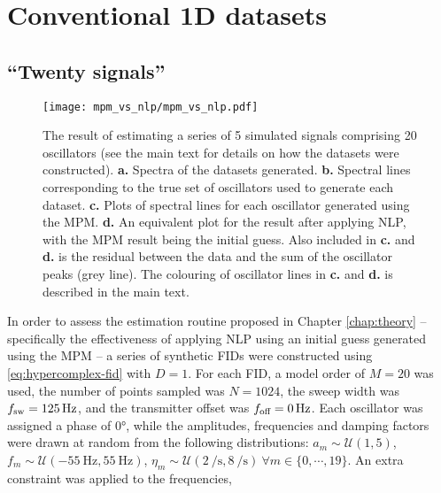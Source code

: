 \section{Conventional \ac{1D} datasets}
\label{sec:evaluation}

\subsection{``Twenty signals''}
\begin{sidewaysfigure}
    \centering
    \texttt{[image: mpm\_vs\_nlp/mpm\_vs\_nlp.pdf]}
    \caption[
        The result of estimating a series of 5 simulated signals comprising 20
        oscillators, using solely the \acs{MPM} and also with phase
        variance-regularised \acs{NLP} afterwards.
    ]{
        The result of estimating a series of 5 simulated signals comprising 20
        oscillators (see the main text for details on how the datasets were constructed).
        \textbf{a.} Spectra of the datasets generated.
        \textbf{b.} Spectral lines corresponding to the true set of oscillators
        used to generate each dataset.
        \textbf{c.} Plots of spectral lines for each oscillator generated using
        the \acs{MPM}.
        \textbf{d.} An equivalent plot for the result after applying \acs{NLP},
        with the \acs{MPM} result being the initial guess.
        Also included in \textbf{c.} and \textbf{d.} is the residual between the
        data and the sum of the oscillator peaks (grey line).
        The colouring of oscillator lines in \textbf{c.} and \textbf{d.} is
        described in the main text.
    }
    \label{fig:mpm_vs_nlp}
\end{sidewaysfigure}
In order to assess the estimation routine proposed in Chapter \ref{chap:theory}
-- specifically the effectiveness of applying \ac{NLP} using an initial guess
generated using the \ac{MPM} -- a series of synthetic \acp{FID} were constructed
using \eqref{eq:hypercomplex-fid} with $D=1$. For each \ac{FID}, a model order
of $M=20$ was used, the number of points sampled was $N = 1024$, the sweep
width was $f_{\mathrm{sw}}=\qty{125}{\hertz}$, and the transmitter offset was $f_{\text{off}}
= \qty{0}{\hertz}$.  Each oscillator was assigned a phase of \ang{0}, while the
amplitudes, frequencies and damping factors were drawn at random from the
following distributions:
$a_m \sim \mathcal{U}(1, 5)$, $f_m \sim \mathcal{U}(\qty{-55}{\hertz},
\qty{55}{\hertz})$, $\eta_m \sim \mathcal{U}(\qty{2}{\per\second},
\qty{8}{\per\second})\ \forall m \in \lbrace 0, \cdots, 19\rbrace$. An extra
constraint was applied to the frequencies,
